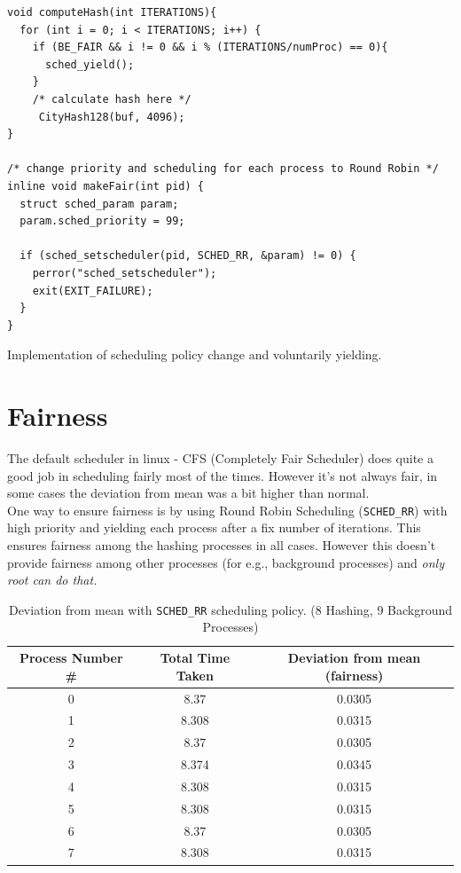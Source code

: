 \documentclass[10pt] {article}
\begin{document}
\begin{listing}[ht!]
\begin{verbatim}
void computeHash(int ITERATIONS){
  for (int i = 0; i < ITERATIONS; i++) {
    if (BE_FAIR && i != 0 && i % (ITERATIONS/numProc) == 0){
      sched_yield();
    }
    /* calculate hash here */
     CityHash128(buf, 4096);
}

/* change priority and scheduling for each process to Round Robin */
inline void makeFair(int pid) {
  struct sched_param param;
  param.sched_priority = 99;
	
  if (sched_setscheduler(pid, SCHED_RR, &param) != 0) {
    perror("sched_setscheduler");
    exit(EXIT_FAILURE);
  }
}
\end{verbatim}
\label{lst:sched}
\caption{Implementation of scheduling policy change and voluntarily yielding.}
\end{listing}

\section{Fairness}
The default scheduler in linux - CFS (Completely Fair Scheduler) does quite a good job in scheduling fairly most of the times. However it's not always fair, in some cases the deviation from mean was a bit higher than normal. \\

\noindent One way to ensure fairness is by using Round Robin Scheduling (\texttt{SCHED\_RR}) with high priority and yielding each process after a fix number of iterations. This ensures fairness among the hashing processes in all cases. However this doesn't provide fairness among other processes (for e.g., background processes) and \emph{only root can do that.} \\

\begin{table}
\centering
\begin{tabular}{ |c|c|c|} 
 \hline
\textbf{Process Number \#} & \textbf{Total Time Taken} & \textbf{Deviation from mean (fairness)}\\
\hline
0 & 8.37 & 0.0305 \\
1 & 8.308 & 0.0315 \\
2 & 8.37 & 0.0305 \\
3 & 8.374 & 0.0345 \\
4 & 8.308 & 0.0315 \\
5 & 8.308 & 0.0315 \\
6 & 8.37 & 0.0305 \\
7 & 8.308 & 0.0315 \\
\hline 
\end{tabular}
\caption{Deviation from mean with \texttt{SCHED\_RR} scheduling policy. (8 Hashing, 9 Background Processes)}
\label{table:schedpolicy}
\end{table}
\end{document}
